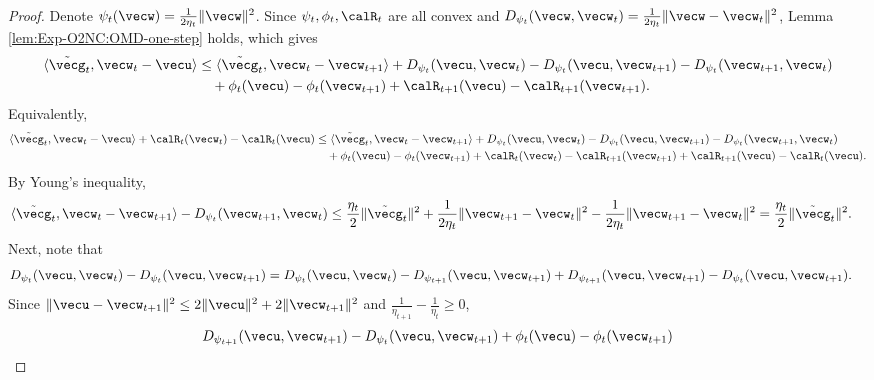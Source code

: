 \begin{proof}
Denote $\psi_t(\vecw)=\frac{1}{2\eta_t}\|\vecw\|^2$. Since $\psi_t,\phi_t,\calR_t$ are all convex and $D_{\psi_t}(\vecw,\vecw_t) = \frac{1}{2\eta_t}\|\vecw-\vecw_t\|^2$, Lemma \ref{lem:Exp-O2NC:OMD-one-step} holds, which gives
\begin{align*}
    \langle \tilde\vecg_t, \vecw_t-\vecu\rangle 
    &\le \langle \tilde\vecg_t,\vecw_t - \vecw_{t+1}\rangle + D_{\psi_t}(\vecu,\vecw_t) - D_{\psi_t}(\vecu,\vecw_{t+1}) - D_{\psi_t}(\vecw_{t+1},\vecw_t) \\
    &\quad + \phi_t(\vecu) - \phi_t(\vecw_{t+1}) + \calR_{t+1}(\vecu) - \calR_{t+1}(\vecw_{t+1}).
\end{align*}
Equivalently,
\begin{align}
    \langle \tilde\vecg_t, \vecw_t-\vecu\rangle + \calR_t(\vecw_t) - \calR_t(\vecu)
    &\le \langle \tilde\vecg_t,\vecw_t - \vecw_{t+1}\rangle + D_{\psi_t}(\vecu,\vecw_t) - D_{\psi_t}(\vecu,\vecw_{t+1}) - D_{\psi_t}(\vecw_{t+1},\vecw_t) \notag\\
    &\quad + \phi_t(\vecu) - \phi_t(\vecw_{t+1}) + \calR_t(\vecw_t) - \calR_{t+1}(\vecw_{t+1}) + \calR_{t+1}(\vecu) - \calR_t(\vecu).
    \label{eq:Exp-O2NC:ogd-vary-1}
\end{align}
By Young's inequality,
\begin{align*}
    \langle \tilde\vecg_t,\vecw_t - \vecw_{t+1}\rangle - D_{\psi_t}(\vecw_{t+1},\vecw_t) 
    &\le \frac{\eta_t}{2}\|\tilde\vecg_t\|^2 + \frac{1}{2\eta_t}\|\vecw_{t+1}-\vecw_t\|^2 - \frac{1}{2\eta_t}\|\vecw_{t+1}-\vecw_t\|^2 
    = \frac{\eta_t}{2}\|\tilde\vecg_t\|^2.
\end{align*}
Next, note that
\begin{align*}
    D_{\psi_t}(\vecu,\vecw_t) - D_{\psi_t}(\vecu,\vecw_{t+1}) 
    &= D_{\psi_t}(\vecu,\vecw_t) - D_{\psi_{t+1}}(\vecu,\vecw_{t+1}) + D_{\psi_{t+1}}(\vecu,\vecw_{t+1}) - D_{\psi_t}(\vecu,\vecw_{t+1}).
\end{align*}
Since $\|\vecu-\vecw_{t+1}\|^2 \le 2\|\vecu\|^2 + 2\|\vecw_{t+1}\|^2$ and $\frac{1}{\eta_{t+1}}-\frac{1}{\eta_t}\ge 0$,
\begin{align*}
    &D_{\psi_{t+1}}(\vecu,\vecw_{t+1}) - D_{\psi_t}(\vecu,\vecw_{t+1}) + \phi_t(\vecu)-\phi_t(\vecw_{t+1}) \\

\end{align*}
\end{proof}
